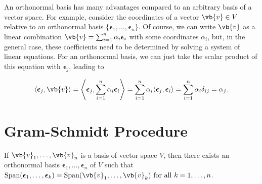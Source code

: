 \documentclass[a4paper,12pt]{report}
\begin{document}
An orthonormal basis has many advantages compared to an arbitrary basis of a vector space. For example, consider the coordinates of a vector \(\vb{v} \in V\) relative to an orthonormal basis \(\{\boldsymbol{\epsilon}_1, \hdots, \boldsymbol{\epsilon}_n\}\). Of course, we can write \(\vb{v}\) as a linear combination \(\vb{v} = \sum_{i=1}^n \alpha_i \boldsymbol{\epsilon}_i\) with some coordinates \(\alpha_i\), but, in the general case, these coefficients need to be determined by solving a system of linear equations. For an orthonormal basis, we can just take the scalar product of this equation with \(\boldsymbol{\epsilon}_j\), leading to

\begin{equation}
\langle \boldsymbol{\epsilon}_j, \vb{v} \rangle = \left\langle \boldsymbol{\epsilon}_j, \sum_{i=1}^n \alpha_i \boldsymbol{\epsilon}_i \right\rangle = \sum_{i=1}^n \alpha_i \langle \boldsymbol{\epsilon}_j, \boldsymbol{\epsilon}_i \rangle = \sum_{i=1}^{n} \alpha_i \delta_{ij} = \alpha_j.
\end{equation}

\section{Gram-Schmidt Procedure}

\begin{theorem}
If \({\vb{v}_1, \ldots, \vb{v}_n }\) is a basis of vector space \(V\), then there exists an orthonormal basis \({\boldsymbol{\epsilon }_{1}, \ldots , \boldsymbol{\epsilon }_{n}    }\) of \(V\) such that \(\text{Span}(\boldsymbol{\epsilon }_{1}, \ldots ,\boldsymbol{\epsilon }_{k} ) = \text{Span}(\vb{v}_1, \ldots, \vb{v}_k ) \text{ for all } k = 1,\ldots ,n \).     
\end{theorem}
\end{document}
